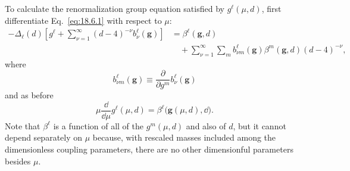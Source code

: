 To calculate the renormalization group equation satisfied by $g^\ell(\mu,d)$, first differentiate Eq.~\eqref{eq:18.6.1} with respect to $\mu$:
\begin{equation}
\begin{aligned}
-\Delta_\ell(d)
\left[g^\ell+\sum_{\nu=1}^{\infty}(d-4)^{-\nu}b_\nu^\ell(\mathbf{g})\right]
&=\beta^\ell(\mathbf{g},d)\\
&\quad+\sum_{\nu=1}^{\infty}\sum_m b_{\nu m}^\ell(\mathbf{g})
\beta^m(\mathbf{g},d)(d-4)^{-\nu},
\end{aligned}
\tag{18.6.2}\label{eq:18.6.2}
\end{equation}
where
\begin{equation}
b_{\nu m}^\ell(\mathbf{g})\equiv
\frac{\partial}{\partial g^m}b_\nu^\ell(\mathbf{g})
\tag{18.6.3}\label{eq:18.6.3}
\end{equation}
and as before
\begin{equation}
\mu\frac{\dd}{\dd\mu}g^\ell(\mu,d)
=\beta^\ell\bigl(\mathbf{g}(\mu,d),\dd\bigr).
\tag{18.6.4}\label{eq:18.6.4}
\end{equation}
Note that $\beta^\ell$ is a function of all of the $g^m(\mu,d)$ and also of $d$, but it cannot depend separately on $\mu$ because, with rescaled masses included among the dimensionless coupling parameters, there are no other dimensionful parameters besides $\mu$.

